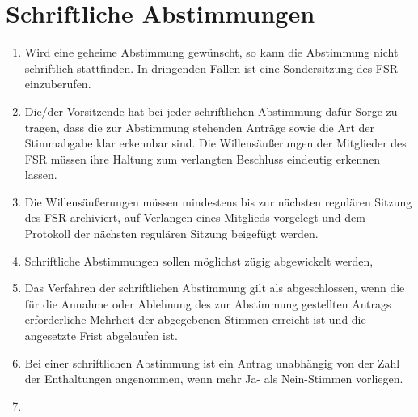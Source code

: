 \documentclass[
	a4paper,
	12pt,
	oneside,
	parskip=half-,
	pagesize,
	headsepline,
	german,
	ngerman
]{scrartcl}
\begin{document}
\section{Schriftliche Abstimmungen}
\label{sec:schriftlich}
\begin{enumerate}
	\item Wird eine geheime Abstimmung gewünscht, so kann die Abstimmung nicht schriftlich stattfinden. In dringenden Fällen ist eine Sondersitzung des FSR einzuberufen.
	\item Die/der Vorsitzende hat bei jeder schriftlichen Abstimmung dafür Sorge zu tragen, dass die zur Abstimmung stehenden Anträge sowie die Art der Stimmabgabe klar erkennbar sind. Die Willensäußerungen der Mitglieder des FSR müssen ihre Haltung zum verlangten Beschluss eindeutig erkennen lassen.
	\item Die Willensäußerungen müssen mindestens bis zur nächsten regulären Sitzung des FSR archiviert, auf Verlangen eines Mitglieds vorgelegt und dem Protokoll der nächsten regulären Sitzung beigefügt werden.
	\item Schriftliche Abstimmungen sollen möglichst zügig abgewickelt werden, 
	\item Das Verfahren der schriftlichen Abstimmung gilt als abgeschlossen, wenn die für die Annahme oder Ablehnung des zur Abstimmung gestellten Antrags erforderliche Mehrheit der abgegebenen Stimmen erreicht ist und die angesetzte Frist abgelaufen ist.
	\item Bei einer schriftlichen Abstimmung ist ein Antrag unabhängig von der Zahl der Enthaltungen angenommen, wenn mehr Ja- als Nein-Stimmen vorliegen.
	\item {}
	
\end{enumerate}
\end{document}
